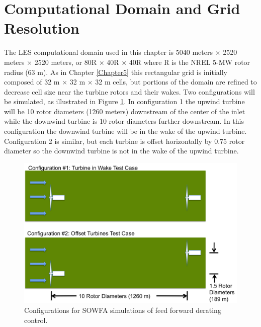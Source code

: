 
\section{Computational Domain and Grid Resolution} \label{section6-3}

The LES computational domain used in this chapter is 5040 meters $\times$ 2520 meters $\times$ 2520 meters, or 80R $\times$ 40R $\times$ 40R where R is the NREL 5-MW rotor radius (63 m). As in Chapter \ref{Chapter5} this rectangular grid is initially composed of 32 m $\times$ 32 m $\times$ 32 m cells, but portions of the domain are refined to decrease cell size near the turbine rotors and their wakes. Two configurations will be simulated, as illustrated in Figure \ref{fig6-1}. In configuration 1 the upwind turbine will be 10 rotor diameters (1260 meters) downstream of the center of the inlet while the downwind turbine is 10 rotor diameters further downstream. In this configuration the downwind turbine will be in the wake of the upwind turbine. Configuration 2 is similar, but each turbine is offset horizontally by 0.75 rotor diameter so the downwind turbine is not in the wake of the upwind turbine. 

\begin{figure}[ht]	
	\centering
		\includegraphics[width = \linewidth]{Figures/ch6Figures/fig6-1.png}
		
	\caption{Configurations for SOWFA simulations of feed forward derating control.}
	\label{fig6-1}
\end{figure}

